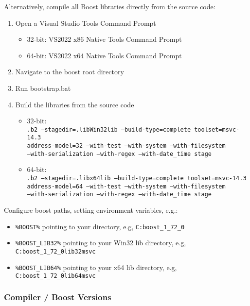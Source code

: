 Alternatively, compile all Boost libraries directly from the source code:
\begin{enumerate}
\item Open a Visual Studio Tools Command Prompt
\begin{itemize}
\item 32-bit: VS2022 x86 Native Tools Command Prompt
\item 64-bit: VS2022 x64 Native Tools Command Prompt
\end{itemize}
\item Navigate to the boost root directory
\item Run bootstrap.bat
\item Build the libraries from the source code
\begin{itemize}
\item 32-bit: \\
  {\footnotesize\tt .{\bs}b2 --stagedir=.{\bs}lib{\bs}Win32{\bs}lib --build-type=complete toolset=msvc-14.3 \bs \\
    address-model=32 --with-test --with-system --with-filesystem  \bs \\
    --with-serialization --with-regex --with-date\_time stage}
\item 64-bit: \\
  {\footnotesize\tt .{\bs}b2 --stagedir=.{\bs}lib{\bs}x64{\bs}lib --build-type=complete toolset=msvc-14.3 \bs \\
    address-model=64 --with-test --with-system --with-filesystem \bs \\
    --with-serialization --with-regex --with-date\_time stage}
\end{itemize}
\end{enumerate}

Configure boost paths, setting environment variables, e.g.:
\begin{itemize}
\item {\tt \%BOOST\%} pointing to your directory, e.g, {\tt C:{\bs}boost\_1\_72\_0} 
\item {\tt \%BOOST\_LIB32\%} pointing to your Win32 lib directory, e.g, {\tt C:{\bs}boost\_1\_72\_0{\bs}lib32\-msvc} 
\item {\tt \%BOOST\_LIB64\%} pointing to your x64 lib directory, e.g, {\tt C:{\bs}boost\_1\_72\_0{\bs}lib64\-msvc} 
\end{itemize}

\subsubsection*{Compiler / Boost Versions}
\label{sec:compiler_boost_versions}

